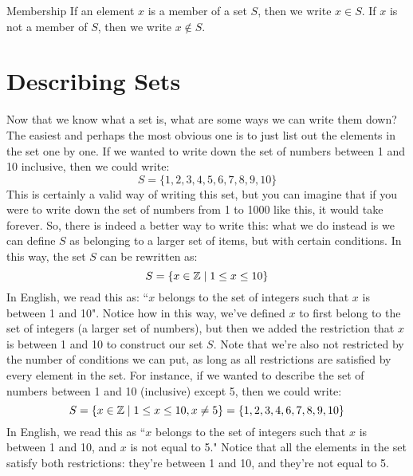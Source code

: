 \begin{notation}{Membership}{}
	If an element \( x \) is a member of a set \( S \), then we write \( x \in S \). If \( x \) is not a 
	member of \( S \), then we write \( x \not\in S \). 
\end{notation}
\section{Describing Sets}
Now that we know what a set is, what are some ways we can write them down? The easiest and perhaps the most 
obvious one is to just list out the elements in the set one by one. If we wanted to write down the set of 
numbers between 1 and 10 inclusive, then we could write:
\[
S = \{1, 2, 3, 4, 5, 6, 7, 8, 9, 10\} 
\] 
This is certainly a valid way of writing this set, but you can imagine that if you were to write down the set 
of numbers from 1 to 1000 like this, it would take forever. So, there is indeed a better way to write this: what we 
do instead is we can define \( S \) as belonging to a larger set of items, but with certain conditions. In this 
way, the set \( S \) can be rewritten as:
\begin{equation}
	\label{setbuild}
S = \{x \in \mathbb Z \mid 1 \le x \le 10\} 
\end{equation} 
In English, we read this as: ``\( x \) belongs to the set of integers
such that \( x \) is between 1 and 10". Notice how in this 
way, we've defined \( x \) to first belong to the set of integers (a larger set of numbers), but then 
we added the restriction that \( x \) is between 1 and 10 to construct our set \( S \). Note that we're also 
not restricted by the number of conditions we can put, as long as all restrictions are satisfied by every 
element in the set. For instance, if we wanted to describe the set of numbers between 1 and 10 (inclusive) except 5, 
then we could write:
\[
S = \{x \in \mathbb Z \mid 1 \le x\le 10, x \neq 5\} = \{1, 2, 3, 4, 6, 7, 8, 9, 10\} 
\] 
In English, we read this as ``\( x \) belongs to the set of integers such that \( x \) is between 1 and 10, 
and \( x \) is not equal to 5." Notice that all the elements in the set satisfy both restrictions: they're 
between 1 and 10, and they're not equal to 5. 
